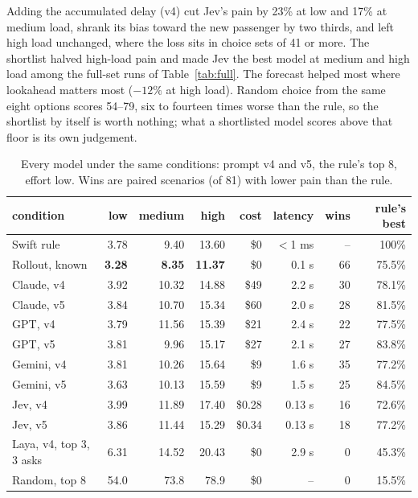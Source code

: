\documentclass[11pt]{article}
\begin{document}
Adding the accumulated delay (v4) cut Jev's pain by 23\% at low and 17\% at medium load, shrank its bias toward the new passenger by two thirds, and left high load unchanged, where the loss sits in choice sets of 41 or more. The shortlist halved high-load pain and made Jev the best model at medium and high load among the full-set runs of Table~\ref{tab:full}. The forecast helped most where lookahead matters most ($-12\%$ at high load). Random choice from the same eight options scores 54--79, six to fourteen times worse than the rule, so the shortlist by itself is worth nothing; what a shortlisted model scores above that floor is its own judgement.

\begin{table}[t]
\centering
\caption{Every model under the same conditions: prompt v4 and v5, the rule's top 8, effort low. Wins are paired scenarios (of 81) with lower pain than the rule.}
\label{tab:top8}
\begin{tabular}{lrrrrrrr}
\toprule
condition & low & medium & high & cost & latency & wins & rule's best \\
\midrule
Swift rule & 3.78 & 9.40 & 13.60 & \$0 & $<$1 ms & -- & 100\% \\
Rollout, known & \textbf{3.28} & \textbf{8.35} & \textbf{11.37} & \$0 & 0.1 s & 66 & 75.5\% \\
Claude, v4 & 3.92 & 10.32 & 14.88 & \$49 & 2.2 s & 30 & 78.1\% \\
Claude, v5 & 3.84 & 10.70 & 15.34 & \$60 & 2.0 s & 28 & 81.5\% \\
GPT, v4 & 3.79 & 11.56 & 15.39 & \$21 & 2.4 s & 22 & 77.5\% \\
GPT, v5 & 3.81 & 9.96 & 15.17 & \$27 & 2.1 s & 27 & 83.8\% \\
Gemini, v4 & 3.81 & 10.26 & 15.64 & \$9 & 1.6 s & 35 & 77.2\% \\
Gemini, v5 & 3.63 & 10.13 & 15.59 & \$9 & 1.5 s & 25 & 84.5\% \\
Jev, v4 & 3.99 & 11.89 & 17.40 & \$0.28 & 0.13 s & 16 & 72.6\% \\
Jev, v5 & 3.86 & 11.44 & 15.29 & \$0.34 & 0.13 s & 18 & 77.2\% \\
Laya, v4, top 3, 3 asks & 6.31 & 14.52 & 20.43 & \$0 & 2.9 s & 0 & 45.3\% \\
Random, top 8 & 54.0 & 73.8 & 78.9 & \$0 & -- & 0 & 15.5\% \\
\bottomrule
\end{tabular}
\end{table}
\end{document}
